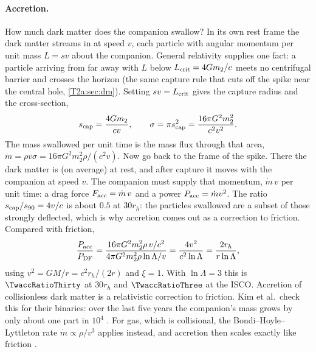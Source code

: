 \paragraph{Accretion.}
How much dark matter does the companion swallow? In its own rest frame the dark matter streams in at speed $v$, each particle with angular momentum per unit mass $L=sv$ about the companion. General relativity supplies one fact: a particle arriving from far away with $L$ below $L_{\rm crit}=4Gm_2/c$ meets no centrifugal barrier and crosses the horizon (the same capture rule that cuts off the spike near the central hole, \cref{T2a:sec:dm}). Setting $sv=L_{\rm crit}$ gives the capture radius and the cross-section,
\[
  s_{\rm cap}=\frac{4Gm_2}{cv},\qquad \sigma=\pi s_{\rm cap}^2=\frac{16\pi G^2m_2^2}{c^2v^2}.
\]
The mass swallowed per unit time is the mass flux through that area, $\dot m=\rho v\sigma=16\pi G^2m_2^2\rho/(c^2v)$. Now go back to the frame of the spike. There the dark matter is (on average) at rest, and after capture it moves with the companion at speed $v$. The companion must supply that momentum, $\dot m\,v$ per unit time: a drag force $F_{\rm acc}=\dot m\,v$ and a power $P_{\rm acc}=\dot mv^2$. The ratio $s_{\rm cap}/s_{90}=4v/c$ is about $0.5$ at $30r_h$: the particles swallowed are a subset of those strongly deflected, which is why accretion comes out as a correction to friction. Compared with friction,
\begin{equation}
  \frac{P_{\rm acc}}{P_{\rm DF}}
  =\frac{16\pi G^2m_2^2\rho\,v/c^2}{4\pi G^2m_2^2\rho\ln\Lambda/v}
  =\frac{4v^2}{c^2\ln\Lambda}
  =\frac{2r_h}{r\ln\Lambda},
\end{equation}
using $v^2=GM/r=c^2r_h/(2r)$ and $\xi=1$. With $\ln\Lambda=3$ this is $\TwaccRatioThirty$ at $30r_h$ and $\TwaccRatioThree$ at the ISCO. Accretion of collisionless dark matter is a relativistic correction to friction. Kim et al.\ check this for their binaries: over the last five years the companion's mass grows by only about one part in $10^4$ \cite[Sec.~IV A]{Kim2023}. For gas, which is collisional, the Bondi--Hoyle--Lyttleton rate $\dot m\propto\rho/v^3$ applies instead, and accretion then scales exactly like friction \cite[Sec.~X]{Barausse2014}.

